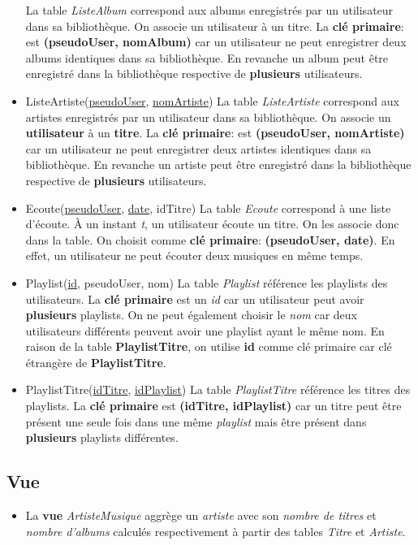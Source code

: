 \documentclass[a4paper,12pt, french]{report}
\begin{document}
\begin{itemize}
        La table \emph{ListeAlbum} correspond aux albums enregistrés par un utilisateur dans sa bibliothèque. On associe un utilisateur à un titre. La \textbf{clé primaire}: est \textbf{(pseudoUser, nomAlbum)} car un utilisateur ne peut enregistrer deux albums identiques dans sa bibliothèque. En revanche un album peut être enregistré dans la bibliothèque respective de \textbf{plusieurs} utilisateurs.
      \item ListeArtiste(\underline{pseudoUser}, \underline{nomArtiste}) \newline
        La table \emph{ListeArtiste} correspond aux artistes enregistrés par un utilisateur dans sa bibliothèque. On associe un \textbf{utilisateur} à un \textbf{titre}. La \textbf{clé primaire}: est \textbf{(pseudoUser, nomArtiste)} car un utilisateur ne peut enregistrer deux artistes identiques dans sa bibliothèque. En revanche un artiste peut être enregistré dans la bibliothèque respective de \textbf{plusieurs} utilisateurs.
      \item Ecoute(\underline{pseudoUser}, \underline{date}, idTitre) \newline
        La table \emph{Ecoute} correspond à une liste d'écoute. À un instant \emph{t}, un utilisateur écoute un titre. On les associe donc dans la table. On choisit comme \textbf{clé primaire}: \textbf{(pseudoUser, date)}. En effet, un utilisateur ne peut écouter deux musiques en même temps.
      \item Playlist(\underline{id}, pseudoUser, nom) \newline
        La table \emph{Playlist} référence les playlists des utilisateurs. La \textbf{clé primaire} est un \emph{id} car un utilisateur peut avoir \textbf{plusieurs} playlists. On ne peut également choisir le \emph{nom} car deux utilisateurs différents peuvent avoir une playlist ayant le même nom. En raison de la table \textbf{PlaylistTitre}, on utilise \textbf{id} comme clé primaire car clé étrangère de \textbf{PlaylistTitre}.
      \item PlaylistTitre(\underline{idTitre}, \underline{idPlaylist}) \newline
        La table \emph{PlaylistTitre} référence les titres des playlists. La \textbf{clé primaire} est \textbf{(idTitre, idPlaylist)} car un titre peut être présent une seule fois dans une même \emph{playlist} mais être présent dans \textbf{plusieurs} playlists différentes.
    \end{itemize}
  \subsection{Vue}
    \begin{itemize}
       \item  La \textbf{vue} \emph{ArtisteMusique} aggrège un \emph{artiste} avec son \emph{nombre de titres} et \emph{nombre d'albums} calculés respectivement à partir des tables \emph{Titre} et \emph{Artiste}.
    \end{itemize}
\end{document}
